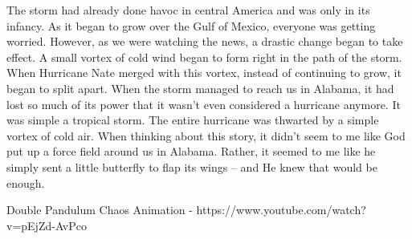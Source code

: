 \documentclass[10pt]{article}
\begin{document}
\begin{multicols}{2}
The storm had already done havoc in central America and was only in its infancy. As it began to grow over the Gulf of Mexico, everyone was getting worried. However, as we were watching the news, a drastic change began to take effect. A small vortex of cold wind began to form right in the path of the storm. When Hurricane Nate merged with this vortex, instead of continuing to grow, it began to split apart. When the storm managed to reach us in Alabama, it had lost so much of its power that it wasn't even considered a hurricane anymore. It was simple a tropical storm. The entire hurricane was thwarted by a simple vortex of cold air. When thinking about this story, it didn't seem to me like God put up a force field around us in Alabama. Rather, it seemed to me like he simply sent a little butterfly to flap its wings -- and He knew that would be enough.




\begin{thebibliography}{9}
{\footnotesize
{} Double Pandulum Chaos Animation - https://www.youtube.com/watch?v=pEjZd-AvPco
}
\end{thebibliography}

\end{multicols}


\end{document}
